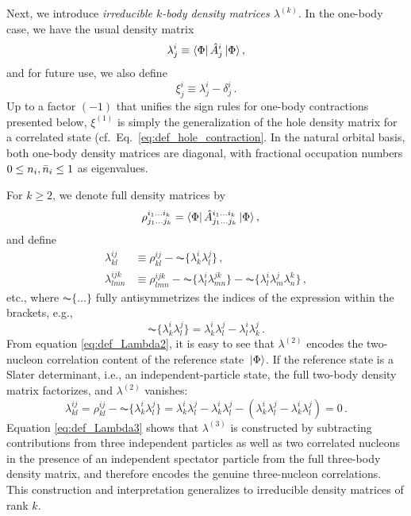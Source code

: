 {Next, we introduce \emph{irreducible $k$-body density matrices $\lambda^{(k)}$}. In
the one-body case, we have the usual density matrix
\begin{equation}
  \lambda^{i}_{j} \equiv \langle{\Phi}|\,{\hat{A}^{i}_{j}}\,|{\Phi}\rangle\,,
\end{equation}
and for future use, we also define
\begin{equation}
  \xi^{i}_{j} \equiv \lambda^{i}_{j} - \delta^{i}_{j}\,.
\end{equation}
Up to a factor $(-1)$ that unifies the sign rules for one-body contractions
presented below, $\xi^{(1)}$ is simply the generalization of the hole 
density matrix for a correlated state (cf.~Eq.~\eqref{eq:def_hole_contraction}. 
In the natural orbital basis, both one-body density matrices are diagonal,
with fractional occupation numbers $0\leq n_i, \bar{n}_i \leq 1$ as eigenvalues. 

For $k\geq 2$, we denote full density matrices by
\begin{align}
  \rho^{i_1 \ldots i_k}_{j_1 \ldots j_k} &= 
    \langle{\Phi}|\,{\hat{A}^{i_1 \ldots i_k}_{j_1 \ldots j_k}}\,|{\Phi}\rangle\,,
\end{align}
and define
\begin{align}
  \lambda^{ij}_{kl} &\equiv \rho^{ij}_{kl} - \AC\{\lambda^{i}_{k}\lambda^{j}_{l}\}\,, \label{eq:def_Lambda2}\\
  \lambda^{ijk}_{lmn}&\equiv \rho^{ijk}_{lmn} - \AC\{\lambda^{i}_{l}\lambda^{jk}_{mn}\} -
                      \AC\{\lambda^{i}_{l}\lambda^{j}_{m}\lambda^{k}_{n}\}\,,\label{eq:def_Lambda3}
\end{align}
etc., where $\AC\{\ldots\}$ fully antisymmetrizes the indices of the expression
within the brackets, e.g.,
\begin{equation}
  \AC\{\lambda^{i}_{k}\lambda^{j}_{l}\} = \lambda^{i}_{k}\lambda^{j}_{l} - 
    \lambda^{i}_{l}\lambda^{j}_{k}\,.
\end{equation}
From equation \eqref{eq:def_Lambda2}, it is easy to see that $\lambda^{(2)}$ encodes the
two-nucleon correlation content of the reference state $\,|{\Phi}\rangle$. If 
the reference state is a Slater determinant, i.e., an independent-particle
state, the full two-body density matrix factorizes, and $\lambda^{(2)}$
vanishes:
\begin{equation}
  \lambda^{ij}_{kl} = \rho^{ij}_{kl} - \AC\{\lambda^{i}_{k}\lambda^{j}_{l}\}
  = \lambda^{i}_{k}\lambda^{j}_{l} -  \lambda^{i}_{k}\lambda^{j}_{l} - 
    \left(\lambda^{i}_{k}\lambda^{j}_{l} -  \lambda^{i}_{k}\lambda^{j}_{l}\right) = 0\,.
\end{equation}
Equation \eqref{eq:def_Lambda3} shows that $\lambda^{(3)}$ is constructed
by subtracting contributions from three independent particles as well as
two correlated nucleons in the presence of an independent spectator particle
from the full three-body density matrix, and therefore encodes the genuine
three-nucleon correlations. This construction and interpretation  
generalizes to irreducible density matrices of rank $k$.

}
